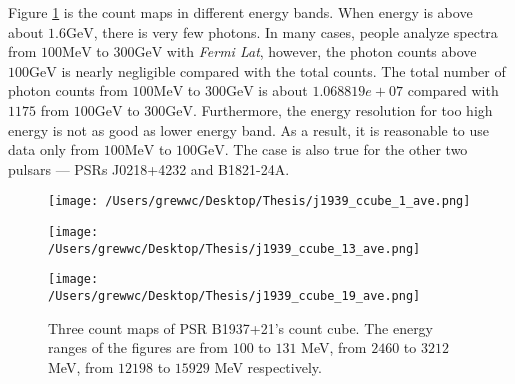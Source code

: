 \documentclass[12pt]{report}
\begin{document}
              Figure \ref{fig: j1939_count_cube_ave} is the count maps in different energy bands.
              When energy is above about $1.6\mbox{GeV}$, there is very few photons. In many cases,
              people analyze spectra from $100\mbox{MeV}$ to $300\mbox{GeV}$ with 
              \textit{Fermi Lat}, however, the photon counts above $100\mbox{GeV}$ is nearly 
              negligible compared with the total counts. The total number of photon counts from 
              $100\mbox{MeV}$ to $300\mbox{GeV}$ is about $1.068819e+07$ compared with $1175$ from
              $100\mbox{GeV}$ to $300\mbox{GeV}$. Furthermore, the energy resolution for too high
              energy is not as good as lower energy band. As a result, it is reasonable to use data
              only from $100\mbox{MeV}$ to $100\mbox{GeV}$. The case is also true for the other two
              pulsars --- PSRs J0218+4232 and B1821-24A. 

            \begin{figure}[!ht]
              \begin{minipage}{0.32\textwidth}
                \begin{center} 
                  \texttt{[image: /Users/grewwc/Desktop/Thesis/j1939\_ccube\_1\_ave.png]}
                \end{center}
              \end{minipage}
              \begin{minipage}{0.32\textwidth}
                \begin{center}
                  \texttt{[image: /Users/grewwc/Desktop/Thesis/j1939\_ccube\_13\_ave.png]}
                \end{center}
              \end{minipage}
              \begin{minipage}{0.32\textwidth}
                \begin{center}
                \texttt{[image: /Users/grewwc/Desktop/Thesis/j1939\_ccube\_19\_ave.png]}
                \end{center}
              \end{minipage}
              \caption{Three count maps of PSR B1937+21's count cube. The energy ranges of the 
                figures are from $100$ to $131$ MeV, from $2460$ to $3212$ MeV, from $12198$ to
                $15929$ MeV respectively.}
              \label{fig: j1939_count_cube_ave}
            \end{figure}
\end{document}
